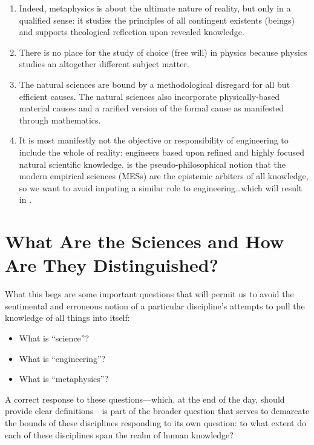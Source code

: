 \begin{enumerate}
\item Indeed, metaphysics is about the ultimate nature of reality, but only in a qualified sense: it studies the principles of all contingent existents (beings) and supports theological reflection upon revealed knowledge.
\item There is no place for the study of choice (free will) in physics because physics studies an altogether different subject matter.
\item The natural sciences are  bound by a methodological disregard for all but efficient causes. The natural sciences also incorporate physically-based material causes and a rarified version of the formal cause as manifested through mathematics.
\item It is most manifestly not the objective or responsibility of engineering to include the whole of reality: engineers  based upon refined and highly focused natural scientific knowledge.  is the pseudo-philosophical notion that the modern empirical sciences (MESs) are the epistemic arbiters of all knowledge, so we want to avoid imputing a similar role to engineering\ldots which will result in .
\end{enumerate}

\section{What Are the Sciences and How Are They Distinguished?}

What this begs are some important questions that will permit us to avoid the sentimental and erroneous notion of a particular discipline's attempts to pull the knowledge of all things into itself:

\begin{itemize}
\item What is ``science''?
\item What is ``engineering''?
\item What is ``metaphysics''?
\end{itemize}

A correct response to these questions---which, at the end of the day, should provide clear definitions---is part of the broader question that serves to demarcate the bounds of these disciplines responding to its own question: to what extent do each of these disciplines span the realm of human knowledge?

